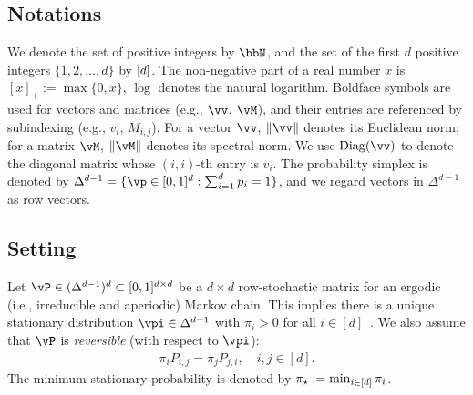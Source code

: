 
\subsection{Notations}
\label{sec:notation}

We denote the set of positive integers by $\bbN$, and
the set of the first $d$ positive integers $\{1,2,\dotsc,d\}$ by $[d]$.
The non-negative part of a real number $x$ is $[x]_+ := \max\{0,x\}$,
$\log$ denotes the natural logarithm.
Boldface symbols are used for vectors and matrices (e.g., $\vv$,
$\vM$), and their entries are referenced by subindexing (e.g., $v_i$,
$M_{i,j}$).
For a vector $\vv$, $\norm{\vv}$ denotes its Euclidean norm; for a
matrix $\vM$, $\norm{\vM}$ denotes its spectral norm.
We use $\Diag(\vv)$ to denote the diagonal matrix whose $(i,i)$-th
entry is $v_i$.
The probability simplex is denoted by $\Delta^{d-1} = \{ \vp
\in [0,1]^d : \sum_{i=1}^d p_i = 1 \}$, and we regard vectors in
$\Delta^{d-1}$ as row vectors.

\subsection{Setting}
\label{sec:setting}

Let $\vP \in (\Delta^{d-1})^d \subset [0,1]^{d \times d}$ be a $d
\times d$ row-stochastic matrix for an ergodic (i.e., irreducible and
aperiodic) Markov chain.
This implies there is a unique stationary distribution $\vpi \in
\Delta^{d-1}$ with $\pi_i > 0$ for all $i \in [d]$~\citep[Corollary
1.17]{LePeWi08}.
We also assume that $\vP$ is \emph{reversible} (with respect to
$\vpi$):
\begin{align}
\label{eq:reversibility}
  \pi_i P_{i,j} = \pi_j P_{j,i} ,
  \quad i,j \in [d] .
\end{align}
The minimum stationary probability is denoted by $\pi_{\star} := \min_{i
\in [d]} \pi_i$.

